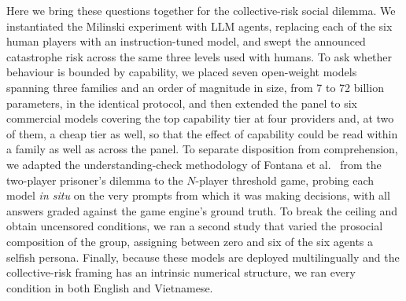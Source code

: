 \documentclass[openacc]{rsproca_new}
\begin{document}
Here we bring these questions together for the collective-risk social dilemma. We instantiated the Milinski experiment with LLM agents, replacing each of the six human players with an instruction-tuned model, and swept the announced catastrophe risk across the same three levels used with humans. To ask whether behaviour is bounded by capability, we placed seven open-weight models spanning three families and an order of magnitude in size, from 7 to 72 billion parameters, in the identical protocol, and then extended the panel to six commercial models covering the top capability tier at four providers and, at two of them, a cheap tier as well, so that the effect of capability could be read within a family as well as across the panel. To separate disposition from comprehension, we adapted the understanding-check methodology of Fontana et al.~\cite{fontana2024nicer} from the two-player prisoner's dilemma to the $N$-player threshold game, probing each model \emph{in situ} on the very prompts from which it was making decisions, with all answers graded against the game engine's ground truth. To break the ceiling and obtain uncensored conditions, we ran a second study that varied the prosocial composition of the group, assigning between zero and six of the six agents a selfish persona. Finally, because these models are deployed multilingually and the collective-risk framing has an intrinsic numerical structure, we ran every condition in both English and Vietnamese.
\end{document}
